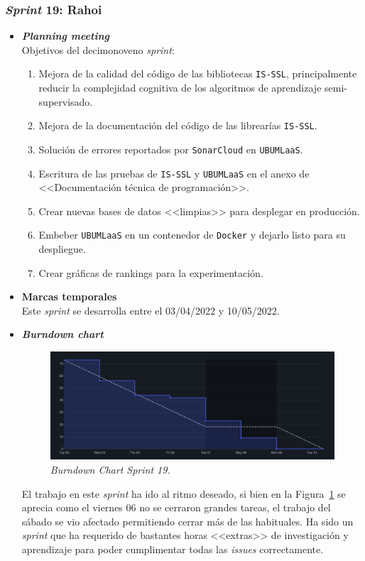 \subsubsection{\textit{Sprint} 19: Rahoi}
\begin{itemize}
\item \textbf{\textit{Planning meeting}}\\
Objetivos del decimonoveno \textit{sprint}:
\begin{enumerate}
\item Mejora de la calidad del código de las bibliotecas \texttt{IS-SSL}, principalmente reducir la complejidad cognitiva de los algoritmos de aprendizaje semi-supervisado.
\item Mejora de la documentación del código de las librearías \texttt{IS-SSL}.
\item Solución de errores reportados por \texttt{SonarCloud} en \texttt{UBUMLaaS}.
\item Escritura de las pruebas de \texttt{IS-SSL} y \texttt{UBUMLaaS} en el anexo de <<Documentación técnica de programación>>.
\item Crear nuevas bases de datos <<limpias>> para desplegar en producción.
\item Embeber \texttt{UBUMLaaS} en un contenedor de \texttt{Docker} y dejarlo listo para su despliegue.
\item Crear gráficas de rankings para la experimentación.
\end{enumerate}

\item \textbf{Marcas temporales}\\
Este \textit{sprint} se desarrolla entre el 03/04/2022 y 10/05/2022.

\item \textbf{\textit{Burndown chart}}\\
\begin{figure}
\begin{center}
\includegraphics[width=\textwidth]{../img/anexos/sprints/BD-Sprint19}
\caption{\textit{Burndown Chart Sprint 19.}}\label{fig:BD-Sprint19}
\end{center}
\end{figure}
El trabajo en este \textit{sprint} ha ido al ritmo deseado, si bien en la Figura~\ref{fig:BD-Sprint19} se aprecia como el viernes 06 no se cerraron grandes tareas, el trabajo del sábado se vio afectado permitiendo cerrar más de las habituales. Ha sido un \textit{sprint} que ha requerido de bastantes horas <<extras>> de investigación y aprendizaje para poder cumplimentar todas las \textit{issues} correctamente.


\end{itemize}
